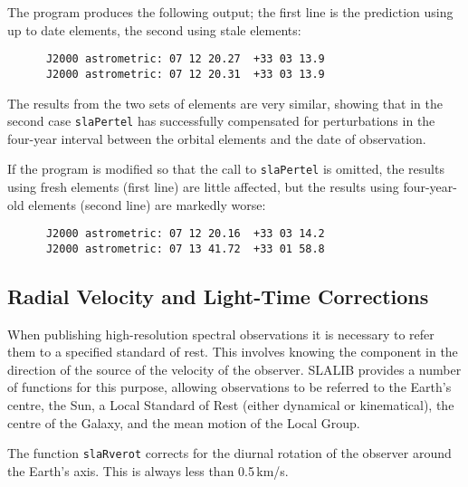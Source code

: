 \documentclass[11pt,fleqn,twoside]{article}
\renewcommand{\_}{{\tt\char'137}}     %
\begin{document}
\vspace{-3ex}
\goodbreak
The program produces the following output; the first line is the
prediction using up to date elements, the second using stale elements:
\goodbreak
\vspace{-3ex}
\begin{verbatim}
      J2000 astrometric: 07 12 20.27  +33 03 13.9
      J2000 astrometric: 07 12 20.31  +33 03 13.9
\end{verbatim}
\vspace{-3ex}
\goodbreak
The results from the two sets of elements are very similar, showing that
in the second case
{\tt slaPertel} has successfully compensated for perturbations in the
four-year interval between the orbital elements and the date of observation.

If the program is modified so that the call to
{\tt slaPertel} is omitted,
the results using fresh elements (first line) are little affected,
but the results using four-year-old elements (second line)
are markedly worse:
\goodbreak
\vspace{-3ex}
\begin{verbatim}
      J2000 astrometric: 07 12 20.16  +33 03 14.2
      J2000 astrometric: 07 13 41.72  +33 01 58.8
\end{verbatim}
\vspace{-3ex}
\goodbreak

\subsection{Radial Velocity and Light-Time Corrections}
When publishing high-resolution spectral observations
it is necessary to refer them to a specified standard of rest.
This involves knowing the component in the direction of the
source of the velocity of the observer.  SLALIB provides a number
of functions for this purpose, allowing observations to be
referred to the Earth's centre, the Sun, a Local Standard of Rest
(either dynamical or kinematical), the centre of the Galaxy, and
the mean motion of the Local Group.
 
The function
{\tt slaRverot}
corrects for the diurnal rotation of
the observer around the Earth's axis.  This is always less than 0.5\,km/s.
 
\end{document}

